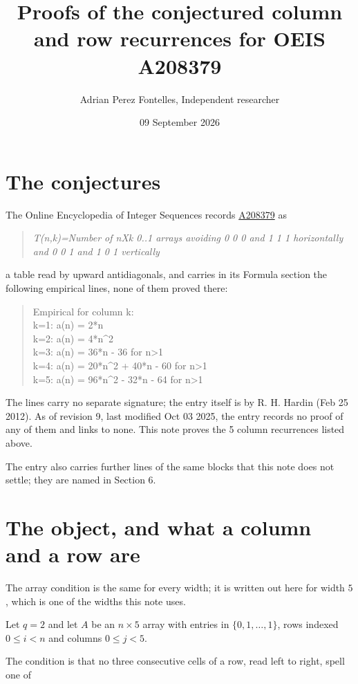 \documentclass[11pt]{article}
\title{Proofs of the conjectured column and row recurrences for OEIS A208379}
\author{Adrian Perez Fontelles, Independent researcher}
\date{09 September 2026}
\theoremstyle{definition}
\begin{document}
\maketitle
\section{The conjectures}

The Online Encyclopedia of Integer Sequences records \href{https://oeis.org/A208379}{A208379} as

\begin{quote}\itshape T(n,k)=Number of nXk 0..1 arrays avoiding 0 0 0 and 1 1 1 horizontally and 0 0 1 and 1 0 1 vertically\end{quote}

a table read by upward antidiagonals, and carries in its Formula section the following empirical lines, none of them proved there:

\begin{quote}\ttfamily Empirical for column k:\\
k=1: a(n) = 2*n\\k=2: a(n) = 4*n\textasciicircum{}2\\k=3: a(n) = 36*n - 36 for n>1\\k=4: a(n) = 20*n\textasciicircum{}2 + 40*n - 60 for n>1\\k=5: a(n) = 96*n\textasciicircum{}2 - 32*n - 64 for n>1\end{quote}

The lines carry no separate signature; the entry itself is by R. H. Hardin (Feb 25 2012). As of revision 9, last modified Oct 03 2025, the entry records no proof of any of them and links to none. This note proves the 5 column recurrences listed above.

The entry also carries further lines of the same blocks that this note does not settle; they are named in Section 6.

\section{The object, and what a column and a row are}

The array condition is the same for every width; it is written out here for width $5$, which is one of the widths this note uses.

Let $q = 2$ and let $A$ be an $n \times 5$ array with entries in $\{0,1,\dots,1\}$, rows indexed $0 \le i < n$ and columns $0 \le j < 5$.

The condition is that no three consecutive cells of a row, read left to right, spell one of
\end{document}
